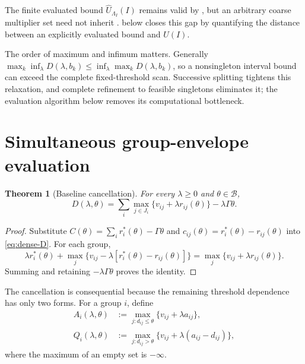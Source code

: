 \documentclass[11pt]{article}
\theoremstyle{plain}
\newtheorem{theorem}{Theorem}
\theoremstyle{definition}
\theoremstyle{remark}
\newcommand{\B}{\mathcal B}
\begin{document}
The finite evaluated bound $\widehat U_{\Lambda_I}(I)$ remains valid by , but an arbitrary coarse multiplier set need not inherit .   below closes this gap by quantifying the distance between an explicitly evaluated bound and $U(I)$.

The order of maximum and infimum matters.  Generally
$\max_k\inf_\lambda D(\lambda,b_k)\le\inf_\lambda\max_kD(\lambda,b_k)$, so a nonsingleton interval bound can exceed the complete fixed-threshold scan.  Successive splitting tightens this relaxation, and complete refinement to feasible singletons eliminates it; the evaluation algorithm below removes its computational bottleneck.

\section{Simultaneous group-envelope evaluation}\label{sec:envelope}

\begin{theorem}[Baseline cancellation]\label{thm:cancellation}
For every $\lambda\ge0$ and $\theta\in\B$,
\begin{equation}\label{eq:cancelled-D}
D(\lambda,\theta)
=\sum_i\max_{j\in J_i}\{v_{ij}+\lambda r_{ij}(\theta)\}
-\lambda\Gamma\theta.
\end{equation}
\end{theorem}
\begin{proof}
Substitute $C(\theta)=\sum_i r_i^*(\theta)-\Gamma\theta$ and
$c_{ij}(\theta)=r_i^*(\theta)-r_{ij}(\theta)$ into \eqref{eq:dense-D}.  For each group,
\[
\lambda r_i^*(\theta)+\max_j\{v_{ij}-\lambda[r_i^*(\theta)-r_{ij}(\theta)]\}
=\max_j\{v_{ij}+\lambda r_{ij}(\theta)\}.
\]
Summing and retaining $-\lambda\Gamma\theta$ proves the identity.
\end{proof}

The cancellation is consequential because the remaining threshold dependence has only two forms.  For a group $i$, define
\begin{align}
A_i(\lambda,\theta)&:=\max_{j:d_{ij}\le\theta}\{v_{ij}+\lambda a_{ij}\},\label{eq:A}\\
Q_i(\lambda,\theta)&:=\max_{j:d_{ij}>\theta}\{v_{ij}+\lambda(a_{ij}-d_{ij})\},\label{eq:Q}
\end{align}
where the maximum of an empty set is $-\infty$.
\end{document}
